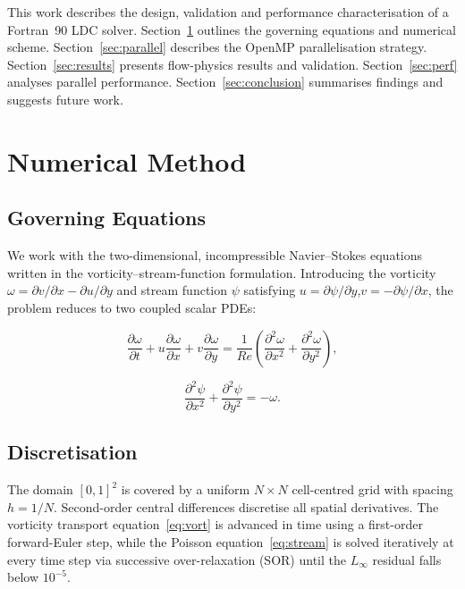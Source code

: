 \documentclass[conference]{IEEEtran}
\begin{document}
This work describes the design, validation and performance characterisation
of a Fortran~90 LDC solver.
Section~\ref{sec:method} outlines the governing equations and numerical
scheme.
Section~\ref{sec:parallel} describes the OpenMP parallelisation strategy.
Section~\ref{sec:results} presents flow-physics results and validation.
Section~\ref{sec:perf} analyses parallel performance.
Section~\ref{sec:conclusion} summarises findings and suggests future work.

\section{Numerical Method}
\label{sec:method}

\subsection{Governing Equations}

We work with the two-dimensional, incompressible Navier--Stokes equations
written in the vorticity--stream-function formulation.
Introducing the vorticity $\omega = \partial v/\partial x - \partial u/\partial y$
and stream function $\psi$ satisfying
$u = \partial\psi/\partial y$,\;$v = -\partial\psi/\partial x$,
the problem reduces to two coupled scalar PDEs:

\begin{equation}
  \frac{\partial\omega}{\partial t}
  + u\frac{\partial\omega}{\partial x}
  + v\frac{\partial\omega}{\partial y}
  = \frac{1}{Re}\left(
      \frac{\partial^2\omega}{\partial x^2}
    + \frac{\partial^2\omega}{\partial y^2}
    \right),
  \label{eq:vort}
\end{equation}

\begin{equation}
  \frac{\partial^2\psi}{\partial x^2}
  + \frac{\partial^2\psi}{\partial y^2}
  = -\omega.
  \label{eq:stream}
\end{equation}

\subsection{Discretisation}

The domain $[0,1]^2$ is covered by a uniform $N\times N$ cell-centred
grid with spacing $h = 1/N$.
Second-order central differences discretise all spatial derivatives.
The vorticity transport equation~\eqref{eq:vort} is advanced in time
using a first-order forward-Euler step, while the Poisson
equation~\eqref{eq:stream} is solved iteratively at every time step
via successive over-relaxation (SOR) until the $L_\infty$ residual
falls below $10^{-5}$.
\end{document}
